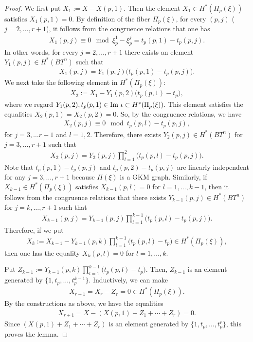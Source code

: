 \documentclass[12pt]{amsart}
\theoremstyle{definition}
\theoremstyle{remark}
\numberwithin{equation}{section}
\begin{document}
\begin{proof}
We first put $X_{1}:=X-X(p,1)$.
Then the element $X_{1}\in H^{*}(\Pi_{p}(\xi))$ satisfies $X_{1}(p,1)=0$.
By definition of the fiber $\Pi_{p}(\xi)$,
for every $(p,j)$ ($j=2,\ldots, r+1$), it follows from the congruence relations that one has
\begin{align*}
X_{1}(p,j)\equiv 0 \mod \xi_{p}^{1}-\xi_{p}^{j}=t_{p}(p,1)-t_{p}(p,j).
\end{align*}
In other words, for every $j=2,\ldots, r+1$
there exists an element $Y_{1}(p,j)\in H^{*}(BT^{n})$ such that
\begin{align*}
X_{1}(p,j)
=Y_{1}(p,j)\bigl(t_{p}(p,1)-t_{p}(p,j)\bigr).
\end{align*}
We next take the following element in $H^{*}(\Pi_{p}(\xi))$:
\begin{align*}
X_{2}:=X_{1}-Y_{1}(p,2)\bigl(t_{p}(p,1)-t_{p}\bigr),
\end{align*}
where we regard $Y_{1}(p,2), t_{p}(p,1)\in {\rm Im}~\iota\subset H^{*}(\Pi_{p}(\xi))$.
This element satisfies the equalities  $X_{2}(p,1)=X_{2}(p,2)=0$.
So, by the congruence relations, we have
\begin{align*}
X_{2}(p,j)\equiv 0 \mod t_{p}(p,l)-t_{p}(p,j),
\end{align*}
for $j=3,\ldots r+1$ and $l=1,2$.
Therefore, there exists $Y_{2}(p,j)\in H^{*}(BT^{n})$ for $j=3,\ldots, r+1$ such that
\begin{align*}
X_{2}(p,j)=Y_{2}(p,j)\prod_{l=1}^{2}\bigl(t_{p}(p,l)-t_{p}(p,j)\bigr).
\end{align*}
Note that $t_{p}(p,1)-t_{p}(p,j)$ and $t_{p}(p,2)-t_{p}(p,j)$ are linearly independent for any  $j=3,\dots,r+1$ because $\Pi(\xi)$ is a GKM graph.
Similarly, if $X_{k-1}\in H^{*}(\Pi_{p}(\xi))$ satisfies $X_{k-1}(p,l)=0$ for $l=1,\ldots, k-1$, then it follows from the congruence relations that there exists  $Y_{k-1}(p,j)\in H^{*}(BT^{n})$ for $j=k,\ldots,r+1$ such that
\begin{align*}
X_{k-1}(p,j)=Y_{k-1}(p,j)\prod_{l=1}^{k-1}\bigl(t_{p}(p,l)-t_{p}(p,j)\bigr).
\end{align*}
Therefore, if we put
\begin{align*}
X_{k}:=X_{k-1}-Y_{k-1}(p,k)\prod_{l=1}^{k-1}\bigl(t_{p}(p,l)-t_{p}\bigr)\in H^{*}(\Pi_{p}(\xi)),
\end{align*}
then one has the equality $X_{k}(p,l)=0$ for $l=1,\ldots, k$.

Put $Z_{k-1}:=Y_{k-1}(p,k)\prod_{l=1}^{k-1}\bigl(t_{p}(p,l)-t_{p}\bigr)$.
Then, $Z_{k-1}$ is an element generated by $\{1,t_{p},\ldots, t_{p}^{k-1}\}$.
Inductively, we can make
\begin{align*}
X_{r+1}=X_{r}-Z_{r}=0\in H^{*}(\Pi_{p}(\xi)).
\end{align*}
By the constructions as above, we have the equalities
\begin{align*}
X_{r+1}=X-(X(p,1)+Z_{1}+\cdots +Z_{r})=0.
\end{align*}
Since $(X(p,1)+Z_{1}+\cdots +Z_{r})$ is an element generated by $\{1,t_{p},\ldots, t_{p}^{r}\}$,
this proves the lemma.
\end{proof}
\end{document}
